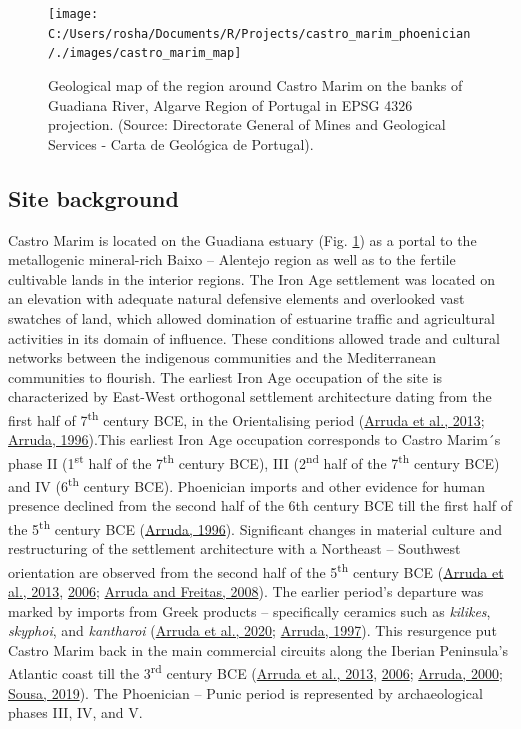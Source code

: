 \documentclass[3p]{elsarticle} %
\begin{document}
\begin{figure}
\texttt{[image: C:/Users/rosha/Documents/R/Projects/castro\_marim\_phoenician/./images/castro\_marim\_map]} \caption{Geological map of the region around Castro Marim on the banks of Guadiana River, Algarve Region of Portugal in EPSG 4326 projection. (Source: Directorate General of Mines and Geological Services - Carta de Geológica de Portugal).}\label{fig:castro-marim-loc}
\end{figure}

\hypertarget{site-background}{%
\subsection{Site background}\label{site-background}}

Castro Marim is located on the Guadiana estuary (Fig. \ref{fig:castro-marim-loc}) as a portal to the metallogenic mineral-rich Baixo -- Alentejo region as well as to the fertile cultivable lands in the interior regions. The Iron Age settlement was located on an elevation with adequate natural defensive elements and overlooked vast swatches of land, which allowed domination of estuarine traffic and agricultural activities in its domain of influence. These conditions allowed trade and cultural networks between the indigenous communities and the Mediterranean communities to flourish. The earliest Iron Age occupation of the site is characterized by East-West orthogonal settlement architecture dating from the first half of 7\textsuperscript{th} century BCE, in the Orientalising period (\protect\hyperlink{ref-arruda_etal13}{Arruda et al., 2013}; \protect\hyperlink{ref-arruda96}{Arruda, 1996}).This earliest Iron Age occupation corresponds to Castro Marim´s phase II (1\textsuperscript{st} half of the 7\textsuperscript{th} century BCE), III (2\textsuperscript{nd} half of the 7\textsuperscript{th} century BCE) and IV (6\textsuperscript{th} century BCE). Phoenician imports and other evidence for human presence declined from the second half of the 6th century BCE till the first half of the 5\textsuperscript{th} century BCE (\protect\hyperlink{ref-arruda96}{Arruda, 1996}). Significant changes in material culture and restructuring of the settlement architecture with a Northeast -- Southwest orientation are observed from the second half of the 5\textsuperscript{th} century BCE (\protect\hyperlink{ref-arruda_etal13}{Arruda et al., 2013}, \protect\hyperlink{ref-arruda_etal06}{2006}; \protect\hyperlink{ref-arruda_freitas08}{Arruda and Freitas, 2008}). The earlier period's departure was marked by imports from Greek products -- specifically ceramics such as \emph{kilikes}, \emph{skyphoi}, and \emph{kantharoi} (\protect\hyperlink{ref-arruda_etal20}{Arruda et al., 2020}; \protect\hyperlink{ref-arruda97}{Arruda, 1997}). This resurgence put Castro Marim back in the main commercial circuits along the Iberian Peninsula's Atlantic coast till the 3\textsuperscript{rd} century BCE (\protect\hyperlink{ref-arruda_etal13}{Arruda et al., 2013}, \protect\hyperlink{ref-arruda_etal06}{2006}; \protect\hyperlink{ref-arruda00}{Arruda, 2000}; \protect\hyperlink{ref-sousa19}{Sousa, 2019}). The Phoenician -- Punic period is represented by archaeological phases III, IV, and V.
\end{document}
